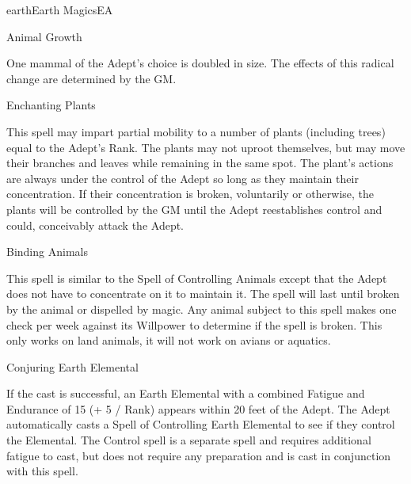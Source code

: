 \begin{College}[1.2]{earth}{Earth Magics}{EA}
\begin{spell}[S-7]{Animal Growth}
\begin{effects}
One mammal of the Adept’s choice is doubled in size.  The effects of
this radical change are determined by the GM.

\end{effects}
\end{spell}

\begin{spell}[S-8]{Enchanting Plants}

\begin{effects}
This spell may impart partial mobility to a number of plants
(including trees) equal to the Adept’s Rank.  The plants may not
uproot themselves, but may move their branches and leaves while
remaining in the same spot.  The plant’s actions are always under the
control of the Adept so long as they maintain their concentration.  If
their concentration is broken, voluntarily or otherwise, the plants
will be controlled by the GM until the Adept reestablishes control and
could, conceivably attack the Adept.

\end{effects}
\end{spell}

\begin{spell}[S-9]{Binding Animals}

\begin{effects}
This spell is similar to the Spell of Controlling Animals except that
the Adept does not have to concentrate on it to maintain it.  The
spell will last until broken by the animal or dispelled by magic. Any
animal subject to this spell makes one check per week against its
Willpower to determine if the spell is broken.  This only works on
land animals, it will not work on avians or aquatics.

\end{effects}
\end{spell}

\begin{spell}[S-10]{Conjuring Earth Elemental}

\begin{effects}
If the cast is successful, an Earth Elemental with a combined Fatigue
and Endurance of 15 (+ 5 / Rank) appears within 20 feet of the Adept.
The Adept automatically casts a Spell of Controlling Earth Elemental
to see if they control the Elemental. The Control spell is a separate
spell and requires additional fatigue to cast, but does not require
any preparation and is cast in conjunction with this spell.


\end{effects}
\end{spell}
\end{College}
